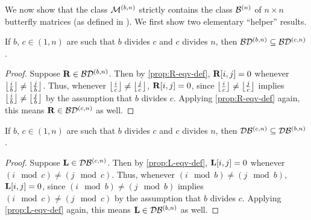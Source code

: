 We now show that the class $\mathcal{M}^{(b,n)}$ strictly contains the class $\mathcal{B}^{(n)}$ of $n \times n$ butterfly matrices (as defined in \citet{dao2020kaleidoscope}). We first show two elementary ``helper'' results.

\begin{proposition}
\label{prop:bd-contain}
If $b,\, c \in (1, n)$ are such that $b$ divides $c$ and $c$ divides $n$, then $\mathcal{B}\mathcal{D}^{(b, n)} \subseteq \mathcal{B}\mathcal{D}^{(c, n)}$.
\end{proposition}
\begin{proof}
Suppose $\mathbf{R} \in \mathcal{B}\mathcal{D}^{(b, n)}$. Then by \cref{prop:R-eqv-def}, $\mathbf{R}[i, j] = 0$ whenever $\left\lfloor\frac{i}{b}\right\rfloor \ne \left\lfloor\frac{j}{b}\right\rfloor$. Thus, whenever $\left\lfloor\frac{i}{c}\right\rfloor \ne \left\lfloor\frac{j}{c}\right\rfloor$, $\mathbf{R}[i, j] = 0$, since $\left\lfloor\frac{i}{c}\right\rfloor \ne \left\lfloor\frac{j}{c}\right\rfloor$ implies $\left\lfloor\frac{i}{b}\right\rfloor \ne \left\lfloor\frac{j}{b}\right\rfloor$ by the assumption that $b$ divides $c$.
Applying \cref{prop:R-eqv-def} again, this means $\mathbf{R} \in \mathcal{B}\mathcal{D}^{(c,n)}$ as well.
\end{proof}

\begin{proposition}
\label{prop:db-contain}
If $b,\, c \in (1, n)$ are such that $b$ divides $c$ and $c$ divides $n$, then $\mathcal{D}\mathcal{B}^{(c, n)} \subseteq \mathcal{D}\mathcal{B}^{(b, n)}$.
\end{proposition}
\begin{proof}
Suppose $\mathbf{L} \in \mathcal{D}\mathcal{B}^{(c, n)}$. Then by \cref{prop:L-eqv-def}, $\mathbf{L}[i, j] = 0$ whenever $(i \mod c) \ne (j \mod c)$. Thus, whenever $(i \mod b) \ne (j \mod b)$, $\mathbf{L}[i, j] = 0$, since $(i \mod b) \ne (j \mod b)$ implies $(i \mod c) \ne (j \mod c)$ by the assumption that $b$ divides $c$.
Applying \cref{prop:L-eqv-def} again, this means $\mathbf{L} \in \mathcal{D}\mathcal{B}^{(b,n)}$ as well.
\end{proof}


